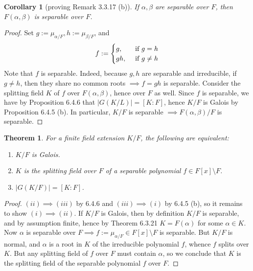 \documentclass[11pt]{book}
\newcounter{counter}
\newtheorem{theorem}[counter]{Theorem}   \newtheorem*{theorem*}{Theorem}   \newtheorem{lemma}[counter]{Lemma}   \newtheorem{corollary}[counter]{Corollary}
\theoremstyle{definition}   \newtheorem{defn}[counter]{Definition} %
\newcommand{\bs}{\setminus}   \newcommand{\A}{\mathcal{A}}   \newcommand{\sy}{\textnormal{Syl}}   \newcommand{\size}[1]{\left| #1 \right|}
\newcommand{\vs}{\vspace{8pt}}   \newcommand{\hs}{\hspace{8pt}}
\numberwithin{counter}{chapter}
\begin{document}
\vs

\begin{corollary}[proving Remark 3.3.17 (b)]
If $\alpha,\beta$ are separable over $F$, then $F(\alpha,\beta)$ is separable over $F$. 
\end{corollary}

\begin{proof}
Set $g := \mu_{\alpha/F}, h := \mu_{\beta/F}$, and 
	\[f := \begin{cases}
	g, \quad &\textnormal{if } g = h \\
	gh, & \textnormal{if } g \ne h
	\end{cases}\]
Note that $f$ is separable. Indeed, because $g,h$ are separable and irreducible, if $g \ne h$, then they share no common roots $\implies f = gh$ is separable. Consider the splitting field $K$ of $f$ over $F(\alpha,\beta)$, hence over $F$ as well. Since $f$ is separable, we have by Proposition 6.4.6 that $|G(K/L)| = [K : F]$, hence $K/F$ is Galois by Proposition 6.4.5 (b). In particular, $K/F$ is separable $\implies F(\alpha,\beta)/F$ is separable. 
\end{proof}

\vs \vs \vs

\begin{theorem}
For a finite field extension $K/F$, the following are equivalent:
\begin{enumerate}
\item[(a)] $K/F$ is Galois.
\item[(b)] $K$ is the splitting field over $F$ of a separable polynomial $f \in F[x] \bs F$.
\item[(c)] $|G(K/F)| = [K : F]$. 
\end{enumerate}
\end{theorem}

\begin{proof}
$(ii) \implies (iii)$ by 6.4.6 and $(iii) \implies (i)$ by 6.4.5 (b), so it remains to show $(i) \implies (ii)$. If $K/F$ is Galois, then by definition $K/F$ is separable, and by assumption finite, hence by Theorem 6.3.21 $K = F(\alpha)$ for some $\alpha \in K$. Now $\alpha$ is separable over $F \implies f := \mu_{\alpha/F} \in F[x] \bs F$ is separable. But $K/F$ is normal, and $\alpha$ is a root in $K$ of the irreducible polynomial $f$, whence $f$ splits over $K$. But any splitting field of $f$ over $F$ must contain $\alpha$, so we conclude that $K$ is the splitting field of the separable polynomial $f$ over $F$. 
\end{proof}
\end{document}

